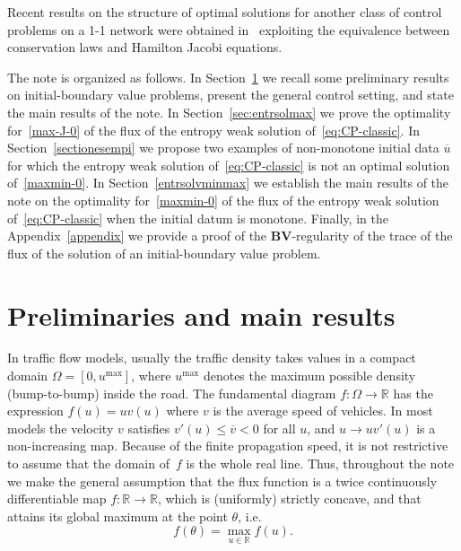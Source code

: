 \documentclass[a4paper, 10pt, final]{article}
\newcommand{\R}{\mathbb{R}} \newcommand{\N}{\mathbb{N}}
\begin{document}
Recent results on the structure of optimal solutions for another class of control 
problems on a 1-1 network
were obtained in~\cite{card1}
exploiting the equivalence between conservation laws and Hamilton Jacobi equations.

The note is organized as follows.
In Section~\ref{sec:prelim} we recall some preliminary results on initial-boundary value problems, 
present the general control setting, 
and state the main results of the note. 
In Section~\ref{sec:entrsolmax} we prove the optimality for~\eqref{max-J-0} of the flux of the entropy weak solution of~\eqref{eq:CP-classic}. In Section~\ref{sectionesempi} we propose two examples of non-monotone initial data $\overline u$
for which the entropy weak solution of~\eqref{eq:CP-classic} is not an optimal solution of~\eqref{maxmin-0}. 
In Section~\ref{entrsolvminmax} we establish the main results of the note on the optimality for~\eqref{maxmin-0} of 
the flux of the entropy weak solution of~\eqref{eq:CP-classic} when the initial datum is monotone. Finally, 
in the Appendix~\ref{appendix} we provide a proof of the $\mathbf{BV}$-regularity of the trace of the flux of 
the solution of an initial-boundary value problem.

 

  
 
\section{Preliminaries and main results}
\label{sec:prelim}
In traffic flow models, usually the traffic density takes values in a compact domain $\Omega = [0, u^{\max}]$,
where $u^{\max}$  denotes the 
maximum possible density (bump-to-bump) inside the road. 
The fundamental diagram $f: \Omega \to\R$ has the expression $f(u)=u v(u)$ where $v$
is the average speed of vehicles. 
In most models the velocity $v$ 
satisfies $v'(u)\leq \overline v<0$
for all $u$,
and $u\to u v'(u)$
is a non-increasing map.
Because of the finite propagation speed,
it is not restrictive to assume
that the domain of~$f$ is the whole real line.
Thus, throughout the note we make the %
general assumption
that the  flux function 
is a twice continuously differentiable
map $f:\R\to\R$, which is (uniformly) strictly concave, and that attains its global maximum at the point $\theta$, 
i.e. \begin{equation}\label{def-theta} f(\theta)=\max_{u\in\R} f(u).\end{equation}
%
\end{document}
